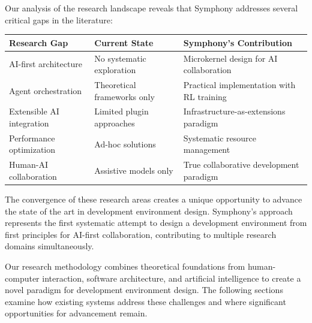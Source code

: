Our analysis of the research landscape reveals that Symphony addresses several critical gaps in the literature:

\begin{center}
\begin{tabular}{@{}lll@{}}
\toprule
\textbf{Research Gap} & \textbf{Current State} & \textbf{Symphony's Contribution} \\
\midrule
AI-first architecture & No systematic exploration & Microkernel design for AI collaboration \\
Agent orchestration & Theoretical frameworks only & Practical implementation with RL training \\
Extensible AI integration & Limited plugin approaches & Infrastructure-as-extensions paradigm \\
Performance optimization & Ad-hoc solutions & Systematic resource management \\
Human-AI collaboration & Assistive models only & True collaborative development paradigm \\
\bottomrule
\end{tabular}
\label{tab:research-contributions}
\end{center}

The convergence of these research areas creates a unique opportunity to advance the state of the art in development environment design. Symphony's approach represents the first systematic attempt to design a development environment from first principles for AI-first collaboration, contributing to multiple research domains simultaneously.

Our research methodology combines theoretical foundations from human-computer interaction, software architecture, and artificial intelligence to create a novel paradigm for development environment design. The following sections examine how existing systems address these challenges and where significant opportunities for advancement remain.
